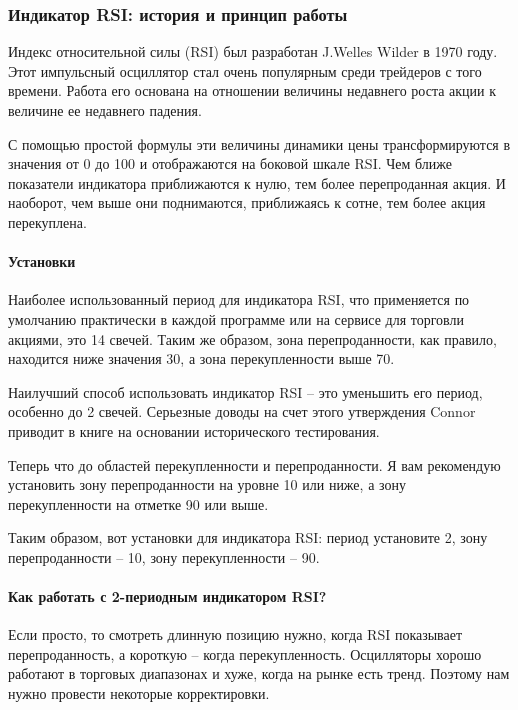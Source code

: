 \documentclass[a5paper]{article}
\begin{document}
\subsubsection{Индикатор RSI: история и принцип работы}

Индекс относительной силы (RSI) был разработан J.Welles Wilder в 1970 году. Этот импульсный осциллятор стал очень популярным среди трейдеров с того времени. Работа его основана на отношении величины недавнего роста акции к величине ее недавнего падения.

С помощью простой формулы эти величины динамики цены трансформируются в значения от 0 до 100 и отображаются на боковой шкале RSI. Чем ближе показатели индикатора приближаются к нулю, тем более перепроданная акция. И наоборот, чем выше они поднимаются, приближаясь к сотне, тем более акция перекуплена.

\paragraph{Установки}

Наиболее использованный период для индикатора RSI, что применяется по умолчанию практически в каждой программе или на сервисе для торговли акциями, это 14 свечей. Таким же образом, зона перепроданности, как правило, находится ниже значения 30, а зона перекупленности выше 70.

Наилучший способ использовать индикатор RSI – это уменьшить его период, особенно до 2 свечей.  Серьезные доводы на счет этого утверждения Connor приводит в книге на основании исторического тестирования.

Теперь что до областей перекупленности и перепроданности. Я вам рекомендую установить зону перепроданности на уровне 10 или ниже, а зону перекупленности на отметке 90 или выше.

Таким образом, вот установки для индикатора RSI: период установите 2,
зону перепроданности – 10, зону перекупленности – 90.

\paragraph{Как работать с 2-периодным индикатором RSI?}

Если просто, то смотреть длинную позицию нужно, когда RSI показывает перепроданность, а короткую – когда перекупленность. Осцилляторы хорошо работают в торговых диапазонах и хуже, когда на рынке есть тренд. Поэтому нам нужно провести некоторые корректировки.
\end{document}
